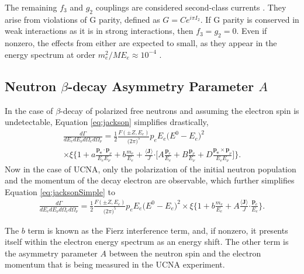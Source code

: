 The remaining $f_3$ and $g_2$ couplings are considered second-class currents \cite{weinberg1958charge}.
They arise from violations of G parity, defined as $G = Ce^{i\pi I_2}$. If G parity is conserved in
weak interactions as it is in strong interactions, then $f_3=g_2=0$. Even if nonzero, the effects
from either are expected to small, as they appear in the energy spectrum at order $m_e^2/ME_e \approx 10^{-4}$
\cite{plaster2012,holstein1974recoil}.


\subsection{Neutron $\beta$-decay Asymmetry Parameter $A$} \label{ssec:neutronAsymmParam}

In the case of $\beta$-decay of polarized free neutrons and assuming the electron spin is undetectable,
Equation \ref{eq:jackson} simplifies drastically,
%
\begin{multline}
  \frac{d\Gamma}{dE_e dE_\nu d\Omega_e d\Omega_\nu} = \frac{1}{2} \frac{F(\pm Z, E_e)}{\big( 2\pi \big)^5}
  p_e E_e \big( E^0 - E_e \big)^2 \\ \times \xi 
  \Bigg\{ 1 + a\frac{\boldsymbol{p_e \cdot p}_\nu}{E_e E_\nu} + b\frac{m_e}{E_e} 
  + \frac{\boldsymbol{\langle J \rangle}}{J} \boldsymbol{\cdot} \Bigg[ A\frac{\boldsymbol{p}_e}{E_e}
    + B\frac{\boldsymbol{p}_\nu}{E_\nu} + D\frac{\boldsymbol{p_e \times p}_\nu}{E_e E_\nu}\Bigg]
  \Bigg\}.
  \label{eq:jacksonSimple}
\end{multline}
%
Now in the case of UCNA, only the polarization of the initial neutron population and the momentum
of the decay electron are observable, which further simplifies Equation \ref{eq:jacksonSimple} to
%
\begin{multline}
  \frac{d\Gamma}{dE_e dE_\nu d\Omega_e d\Omega_\nu} = \frac{1}{2} \frac{F(\pm Z, E_e)}{\big( 2\pi \big)^5}
  p_e E_e \big( E^0 - E_e \big)^2 \times \xi 
  \Bigg\{ 1 + b\frac{m_e}{E_e} 
  + A \frac{\boldsymbol{\langle J \rangle}}{J} \boldsymbol{\cdot}\frac{\boldsymbol{p}_e}{E_e}
  \Bigg\}.
  \label{eq:jacksonSimple2}
\end{multline}
%

The $b$ term is known as the Fierz interference term, and, if nonzero, it presents itself
within the electron energy spectrum as an energy shift. The other term is the asymmetry parameter
$A$ between the neutron spin and the electron momentum that is being measured in the UCNA experiment.

